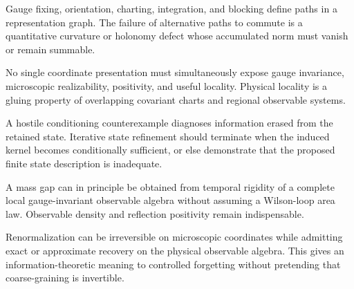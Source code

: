 \begin{hypothesis}
Gauge fixing, orientation, charting, integration, and blocking define paths
in a representation graph.  The failure of alternative paths to commute is a
quantitative curvature or holonomy defect whose accumulated norm must vanish
or remain summable.
\end{hypothesis}

\begin{hypothesis}
No single coordinate presentation must simultaneously expose gauge
invariance, microscopic realizability, positivity, and useful locality.
Physical locality is a gluing property of overlapping covariant charts and
regional observable systems.
\end{hypothesis}

\begin{hypothesis}
A hostile conditioning counterexample diagnoses information erased from the
retained state.  Iterative state refinement should terminate when the induced
kernel becomes conditionally sufficient, or else demonstrate that the
proposed finite state description is inadequate.
\end{hypothesis}

\begin{hypothesis}
A mass gap can in principle be obtained from temporal rigidity of a complete
local gauge-invariant observable algebra without assuming a Wilson-loop area
law.  Observable density and reflection positivity remain indispensable.
\end{hypothesis}

\begin{hypothesis}
Renormalization can be irreversible on microscopic coordinates while
admitting exact or approximate recovery on the physical observable algebra.
This gives an information-theoretic meaning to controlled forgetting without
pretending that coarse-graining is invertible.
\end{hypothesis}
